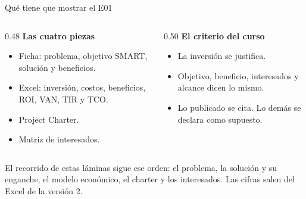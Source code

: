 \documentclass[aspectratio=169,11pt]{beamer}
\begin{document}
\begin{frame}{Qué tiene que mostrar el E01}
\vspace{0.15cm}
\begin{columns}[T]
\begin{column}{0.48\textwidth}
{\color{bcp}\bfseries Las cuatro piezas}
\begin{itemize}
\setlength{\itemsep}{0.18em}
  \item Ficha: problema, objetivo SMART, solución y beneficios.
  \item Excel: inversión, costos, beneficios, ROI, VAN, TIR y TCO.
  \item Project Charter.
  \item Matriz de interesados.
\end{itemize}
\end{column}
\begin{column}{0.50\textwidth}
{\color{cobre}\bfseries El criterio del curso}
\begin{itemize}
\setlength{\itemsep}{0.18em}
  \item La inversión se justifica.
  \item Objetivo, beneficio, interesados y alcance dicen lo mismo.
  \item Lo publicado se cita. Lo demás se declara como supuesto.
\end{itemize}
\end{column}
\end{columns}
\vspace{0.4cm}
{\small El recorrido de estas láminas sigue ese orden: el problema, la solución y su enganche, el modelo económico, el charter y los interesados. Las cifras salen del Excel de la versión 2.}
\end{frame}
\end{document}
